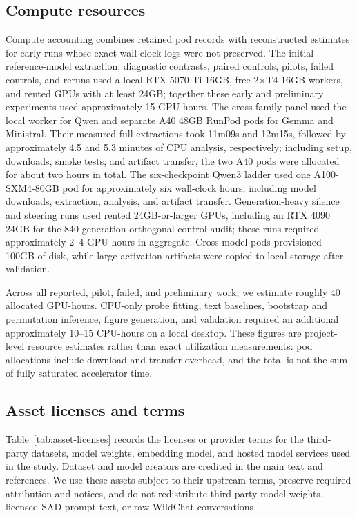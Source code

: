 \documentclass{article}
\begin{document}
\subsection{Compute resources}

Compute accounting combines retained pod records with reconstructed estimates
for early runs whose exact wall-clock logs were not preserved. The initial
reference-model extraction, diagnostic contrasts, paired controls, pilots,
failed controls, and reruns used a local RTX 5070 Ti 16GB, free 2$\times$T4
16GB workers, and rented GPUs with at least 24GB; together these early and
preliminary experiments used approximately 15 GPU-hours. The cross-family
panel used the local worker for Qwen and separate A40 48GB RunPod pods for Gemma and
Ministral. Their measured full extractions took 11m09s and 12m15s, followed by
approximately 4.5 and 5.3 minutes of CPU analysis, respectively; including
setup, downloads, smoke tests, and artifact transfer, the two A40 pods were
allocated for about two hours in total. The six-checkpoint Qwen3 ladder used one
A100-SXM4-80GB pod for approximately six wall-clock hours, including model
downloads, extraction, analysis, and artifact transfer. Generation-heavy
silence and steering runs used rented 24GB-or-larger GPUs, including an RTX
4090 24GB for the 840-generation orthogonal-control audit; these runs required
approximately 2--4 GPU-hours in aggregate. Cross-model pods provisioned 100GB
of disk, while large activation artifacts were copied to local storage after
validation.

Across all reported, pilot, failed, and preliminary work, we estimate roughly
40 allocated GPU-hours. CPU-only probe fitting, text baselines, bootstrap and
permutation inference, figure generation, and validation required an additional
approximately 10--15 CPU-hours on a local desktop. These figures are
project-level resource estimates rather than exact utilization measurements:
pod allocations include download and transfer overhead, and the total is not
the sum of fully saturated accelerator time.

\subsection{Asset licenses and terms}

Table~\ref{tab:asset-licenses} records the licenses or provider terms for the
third-party datasets, model weights, embedding model, and hosted model services
used in the study. Dataset and model creators are credited in the main text and
references. We use these assets subject to their upstream terms, preserve
required attribution and notices, and do not redistribute third-party model
weights, licensed SAD prompt text, or raw WildChat conversations.
\end{document}

